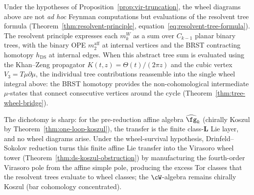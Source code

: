 \begin{remark}
Under the hypotheses of Proposition~\ref{prop:vir-truncation}, the
wheel diagrams above are not \emph{ad hoc} Feynman computations but
evaluations of the resolvent tree formula
(Theorem~\ref{thm:resolvent-principle},
equation~\eqref{eq:resolvent-tree-formula}). The resolvent
principle expresses each $m_k^W$ as a sum over $C_{k-1}$
planar binary trees, with the binary OPE $m_2^{\mathrm{aff}}$
at internal vertices and the BRST contracting homotopy
$h_{\mathrm{DS}}$ at internal edges. When this abstract tree
sum is evaluated using the Khan--Zeng propagator
$K(t,z) = \Theta(t)/(2\pi z)$ and the cubic vertex
$V_3 = T\mu\partial\mu$, the individual tree contributions
reassemble into the single wheel integral above:
the BRST homotopy provides the non-cohomological intermediate
$\mu$-states that connect consecutive vertices around the
cycle (Theorem~\ref{thm:tree-wheel-bridge}).

The dichotomy is sharp: for the pre-reduction affine
algebra $\widehat{\fg}_k$ (chirally Koszul by
Theorem~\ref{thm:one-loop-koszul}), the transfer is the finite
class-$\mathbf{L}$ Lie layer, and no wheel diagrams arise.
Under the wheel-survival hypothesis, Drinfeld--Sokolov
reduction turns this finite affine Lie transfer into the Virasoro wheel tower
(Theorem~\ref{thm:ds-koszul-obstruction}) by manufacturing
the fourth-order Virasoro pole from the affine simple pole,
producing the excess Tor classes that the resolvent trees
evaluate to wheel classes; the $\cW$-algebra remains
chirally Koszul (bar cohomology concentrated).
\end{remark}

